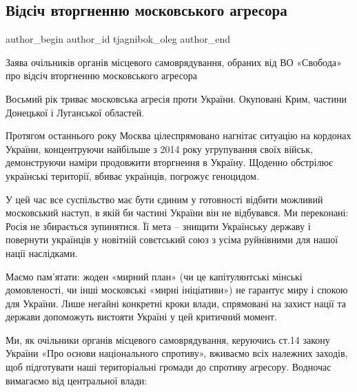  
 
 
 
 
 
\subsection{Відсіч вторгненню московського агресора}
\label{sec:26_01_2022.fb.tjagnibok_oleg.1.vidsich}
 
\ifcmt
 author_begin
   author_id tjagnibok_oleg
 author_end
\fi

Заява очільників органів місцевого самоврядування, обраних від ВО «Свобода» про
відсіч вторгненню московського агресора

Восьмий рік триває московська агресія проти України. Окуповані Крим, частини
Донецької і Луганської областей.

Протягом останнього року Москва цілеспрямовано нагнітає ситуацію на кордонах
України, концентруючи найбільше з 2014 року угрупування своїх військ,
демонструючи наміри продовжити вторгнення в Україну. Щоденно обстрілює
українські території, вбиває українців, погрожує геноцидом.


У цей час все суспільство має бути єдиним у готовності відбити можливий
московський наступ, в якій би частині України він не відбувався. Ми переконані:
Росія не збирається зупинятися. Її мета – знищити Українську державу і
повернути українців у новітній совєтський союз з усіма руйнівними для нашої
нації наслідками.

Маємо пам’ятати: жоден «мирний план» (чи це капітулянтські мінські
домовленості, чи інші московські «мирні ініціативи») не гарантує миру і спокою
для України. Лише негайні конкретні кроки влади, спрямовані на захист нації та
держави допоможуть вистояти Україні у цей критичний момент.

Ми, як очільники органів місцевого самоврядування, керуючись ст.14 закону
України «Про основи національного спротиву», вживаємо всіх належних заходів,
щоб підготувати наші територіальні громади до спротиву агресору. Водночас
вимагаємо від центральної влади:

